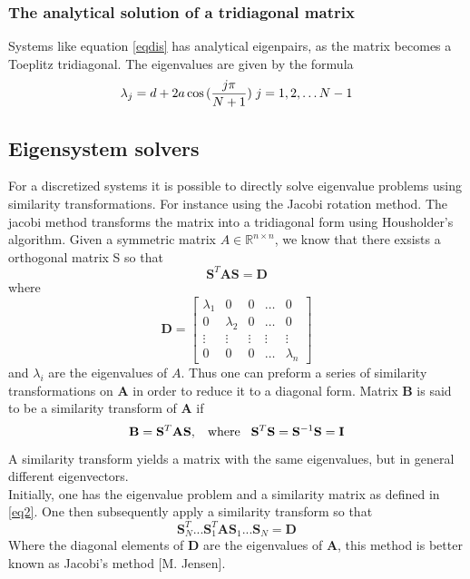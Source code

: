 \documentclass[%
reprint,
amsmath,amssymb,
aps,
]{revtex4-1}
\begin{document}
\subsubsection{The analytical solution of a tridiagonal matrix}
Systems like equation \ref{eqdis} has analytical eigenpairs, as the matrix becomes a Toeplitz tridiagonal. The eigenvalues are given by the formula
\begin{equation}\label{analytical}
\lambda_j = d+2a\cos{(\frac{j\pi}{N+1})} \hspace{0.1cm} j=1,2,\dots N-1
\end{equation}


\subsection*{Eigensystem solvers} \noindent 
For a discretized systems it is possible to directly solve eigenvalue problems using similarity transformations. For instance using the Jacobi rotation method. The jacobi method transforms the matrix into a tridiagonal form using Housholder's algorithm. Given a symmetric matrix $A\in \mathbb{R}^{n\times n}$, we know that there exsists a orthogonal matrix S so that 
\begin{equation*}
	\mathbf{S}^T\mathbf{A}\mathbf{S} = \mathbf{D}
\end{equation*}
where 
\begin{equation*}
	\mathbf{D} = \begin{bmatrix}
	\lambda_1 & 0 & 0 & \dots & 0 \\
	0 & \lambda_2 & 0 & \dots & 0 \\
	\vdots & \vdots & \vdots &\vdots&\vdots\\
	0 & 0 & 0 &\dots & \lambda_n
	\end{bmatrix}
\end{equation*}
and $\lambda_i$ are the eigenvalues of $A$. Thus one can preform a series of similarity transformations on $\mathbf{A}$ in order to reduce it to a diagonal form. Matrix $\mathbf{B}$ is said to be a similarity transform of $\mathbf{A}$ if 
\begin{equation} \label{eq2}
	\mathbf{B} = \mathbf{S}^T\mathbf{A}\mathbf{S}, \hspace{3mm} \textnormal{where} \hspace{3mm} \mathbf{S}^T\mathbf{S} = \mathbf{S}^{-1}\mathbf{S} = \mathbf{I}
\end{equation}
A similarity transform yields a matrix with the same eigenvalues, but in general different eigenvectors. \\
Initially, one has the eigenvalue problem and a similarity matrix as defined in \ref{eq2}. One then subsequently apply a similarity transform so that 
\begin{equation}
	\mathbf{S}_N^T...\mathbf{S}_1^T\mathbf{A}\mathbf{S}_1...\mathbf{S}_N = \mathbf{D}
\end{equation}
Where the diagonal elements of $\mathbf{D}$ are the eigenvalues of $\mathbf{A}$, this method is better known as Jacobi's method [M. Jensen].
\end{document}
